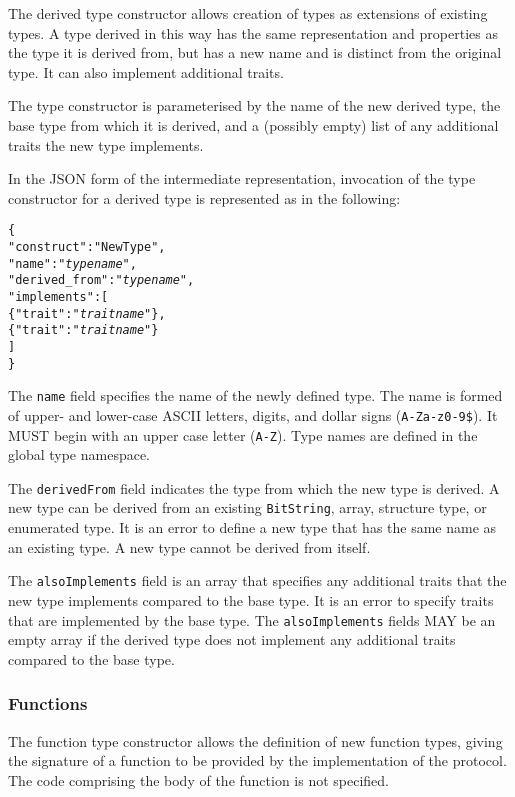 \documentclass[10pt,twocolumn,a4paper]{article}
\newcommand{\code}[1]{\texttt{#1}}
\begin{document}
The derived type constructor allows creation of types as extensions of
existing types. A type derived in this way has the same representation
and properties as the type it is derived from, but has a new name and is
distinct from the original type. It can also implement additional traits.

The type constructor is parameterised by the name of the new derived type,
the base type from which it is derived, and a (possibly empty) list of any
additional traits the new type implements.

In the JSON form of the intermediate representation, invocation of the
type constructor for a derived type is represented as in the following:
\footnotesize
\begin{alltt}
  \{
    "construct"     : "NewType",
    "name"          : "\emph{type name}",
    "derived\_from"  : "\emph{type name}",
    "implements"    : [
      \{"trait" : "\emph{trait name}"\},
      \{"trait" : "\emph{trait name}"\}
    ]
  \}
\end{alltt}
\normalsize
The \code{name} field specifies the name of the newly defined type. The
name is formed of upper- and lower-case ASCII letters, digits, and dollar
signs (\code{A-Za-z0-9\$}).  It MUST begin with an upper case letter
(\code{A-Z}). Type names are defined in the global type namespace.

The \code{derivedFrom} field indicates the type from which the new type is
derived.  A new type can be derived from an existing \code{BitString},
array, structure type, or enumerated type. It is an error to define a new
type that has the same name as an existing type. A new type cannot be
derived from itself.

The \code{alsoImplements} field is an array that specifies any additional
traits that the new type implements compared to the base type. It is an
error to specify traits that are implemented by the base type.
The \code{alsoImplements} fields MAY be an empty array if the derived type
does not implement any additional traits compared to the base type.

\subsubsection{Functions}
\label{sec:functions}

The function type constructor allows the definition of new function types,
giving the signature of a function to be provided by the implementation of
the protocol. The code comprising the body of the function is not specified. 
\end{document}
